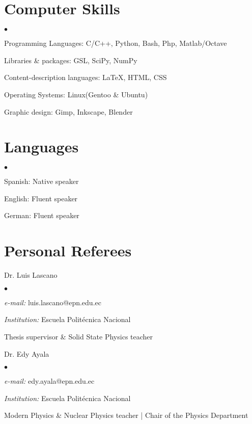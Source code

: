 \documentclass[margin,line]{res}
\newenvironment{list1}{
  \begin{list}{\ding{113}}{%
      \setlength{\itemsep}{0in}
      \setlength{\parsep}{0in} \setlength{\parskip}{0in}
      \setlength{\topsep}{0in} \setlength{\partopsep}{0in} 
      \setlength{\leftmargin}{0.17in}}}{\end{list}}
\newenvironment{list2}{
  \begin{list}{$\bullet$}{%
      \setlength{\itemsep}{0in}
      \setlength{\parsep}{0in} \setlength{\parskip}{0in}
      \setlength{\topsep}{0in} \setlength{\partopsep}{0in} 
      \setlength{\leftmargin}{0.2in}}}{\end{list}}
\begin{document}
\begin{resume}
\section{\sc Computer Skills}
  \begin{list2}
    \item Programming Languages:  C/C++, Python, Bash, Php, Matlab/Octave
    \item Libraries \& packages: GSL, SciPy, NumPy
    \item Content-description languages: \LaTeX, HTML, CSS
    \item Operating Systems:  Linux(Gentoo \& Ubuntu)
    \item Graphic design: Gimp, Inkscape, Blender
  \end{list2}

\section{\sc Languages}
  \begin{list2}
    \item Spanish: Native speaker
    \item English: Fluent speaker
    \item German: Fluent speaker
  \end{list2}
  
\section{\sc Personal Referees}
 \begin{list1}
  \item[] Dr. Luis Lascano
  \begin{list2}
   \item {\it e-mail:} luis.lascano@epn.edu.ec
   \item {\it Institution:} Escuela Politécnica Nacional
   \item Thesis supervisor \& Solid State Physics teacher
  \end{list2}
 \end{list1}

 \begin{list1}
  \item[] Dr. Edy Ayala
  \begin{list2}
   \item {\it e-mail:} edy.ayala@epn.edu.ec
   \item {\it Institution:} Escuela Politécnica Nacional
   \item Modern Physics \& Nuclear Physics teacher | Chair of the Physics Department
  \end{list2}
 \end{list1}
 

\end{resume}
\end{document}
